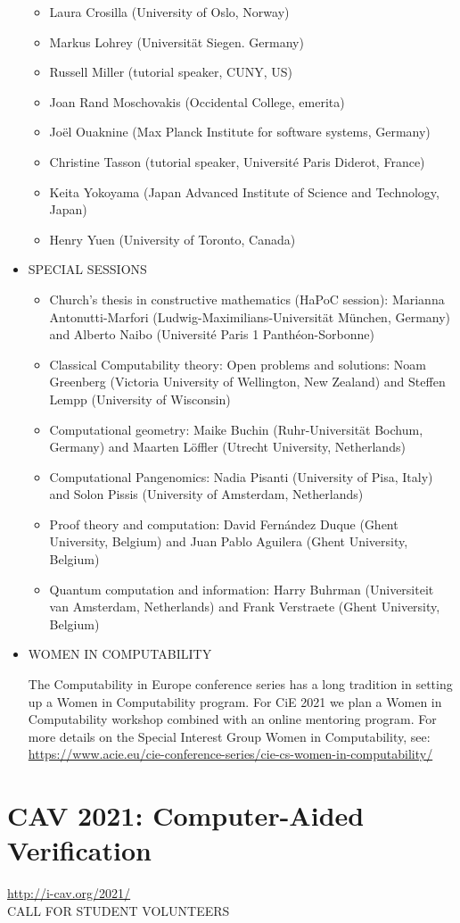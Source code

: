 \documentclass[prodmode,acmtecs]{acmsmall} %
\begin{document}
\begin{itemize}
\begin{itemize}\item  Laura Crosilla (University of Oslo, Norway)
\item  Markus Lohrey (Universität Siegen. Germany)
\item  Russell Miller (tutorial speaker, CUNY, US)
\item  Joan Rand Moschovakis (Occidental College, emerita)
\item  Joël Ouaknine (Max Planck Institute for software systems, Germany)
\item  Christine Tasson (tutorial speaker, Université Paris Diderot, France)
\item  Keita Yokoyama (Japan Advanced Institute of Science and Technology, Japan)
\item  Henry Yuen (University of Toronto, Canada)
\end{itemize} 
\item  SPECIAL SESSIONS 
 
\begin{itemize}\item  Church's thesis in constructive mathematics (HaPoC session): Marianna Antonutti-Marfori (Ludwig-Maximilians-Universität München, Germany) and Alberto Naibo (Université Paris 1 Panthéon-Sorbonne)
\item  Classical Computability theory: Open problems and solutions: Noam Greenberg (Victoria University of Wellington, New Zealand) and Steffen Lempp (University of Wisconsin)
\item  Computational geometry: Maike Buchin (Ruhr-Universität Bochum, Germany) and Maarten Löffler (Utrecht University, Netherlands)
\item  Computational Pangenomics: Nadia Pisanti (University of Pisa, Italy) and Solon Pissis (University of Amsterdam, Netherlands)
\item  Proof theory and computation: David Fernández Duque (Ghent University, Belgium) and Juan Pablo Aguilera (Ghent University, Belgium)
\item  Quantum computation and information: Harry Buhrman (Universiteit van Amsterdam, Netherlands) and Frank Verstraete (Ghent University, Belgium)
\end{itemize} 
\item  WOMEN IN COMPUTABILITY 
 
  The Computability in Europe conference series has a long tradition in setting up a Women in Computability program. For CiE 2021 we plan a Women in Computability workshop combined with an online mentoring program. For more details on the Special Interest Group Women in Computability, see: \href{https://www.acie.eu/cie-conference-series/cie-cs-women-in-computability/}{https://www.acie.eu/cie-conference-series/cie-cs-women-in-computability/} 
 
\end{itemize}\section{CAV 2021: Computer-Aided Verification}\label{CAV2021}  \href{http://i-cav.org/2021/}{http://i-cav.org/2021/}\\ 
CALL FOR STUDENT VOLUNTEERS 
\end{document}
